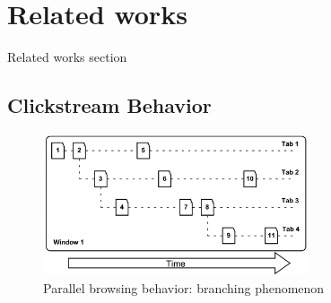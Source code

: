 \section{Related works}
\label{ch:relate}

Related works section



\subsection{Clickstream Behavior}





\begin{figure}[H]
    \centering
    \includegraphics[width=0.7\textwidth]{figures/branching-and-backtracking}
    \caption{Parallel browsing behavior: branching phenomenon \cite{huang2010parallel}}
    \label{fig:backtrace}
\end{figure}

